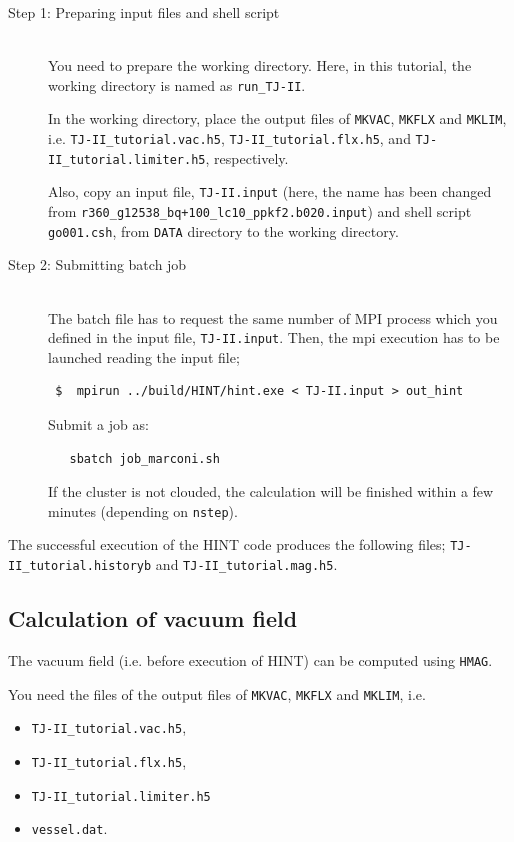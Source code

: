 \documentclass[10pt]{ltxdoc} %
\begin{document}
\begin{description}

 \item[Step 1: Preparing input files and shell script]\mbox{}\\
  You need to prepare the working directory. 
  Here, in this tutorial, the working directory is named as \texttt{run\_TJ-II}. 

  In the working directory, place the output files of \texttt{MKVAC}, \texttt{MKFLX} and \texttt{MKLIM}, i.e. \texttt{TJ-II\_tutorial.vac.h5}, \texttt{TJ-II\_tutorial.flx.h5}, and \texttt{TJ-II\_tutorial.limiter.h5}, respectively.  

  Also, copy an input file, \texttt{TJ-II.input} (here, the name has been changed from \texttt{r360\_g12538\_bq+100\_lc10\_ppkf2.b020.input}) and shell script \texttt{go001.csh}, from \texttt{DATA} directory to the working directory. 

 \item[Step 2: Submitting batch job]\mbox{}\\

 The batch file has to request the same number of MPI process which you defined in the input file, \texttt{TJ-II.input}. Then, the mpi execution has to be launched reading the input file;
 \begin{verbatim}
 $  mpirun ../build/HINT/hint.exe < TJ-II.input > out_hint
\end{verbatim}
  
  Submit a job as:
  \begin{verbatim}
   sbatch job_marconi.sh
  \end{verbatim}
  If the cluster is not clouded, the calculation will be finished within a few minutes (depending on \texttt{nstep}).
\end{description}


The successful execution of the HINT code produces the following files;
\texttt{TJ-II\_tutorial.historyb} and \texttt{TJ-II\_tutorial.mag.h5}.


\subsection{Calculation of vacuum field}
The vacuum field (i.e. before execution of HINT) can be computed using \texttt{HMAG}. 

You need the files of the output files of \texttt{MKVAC}, \texttt{MKFLX} and \texttt{MKLIM}, i.e.
\begin{itemize}
    \item \texttt{TJ-II\_tutorial.vac.h5}, 
    \item \texttt{TJ-II\_tutorial.flx.h5},
    \item \texttt{TJ-II\_tutorial.limiter.h5}
    \item \texttt{vessel.dat}.
\end{itemize}
\end{document}
